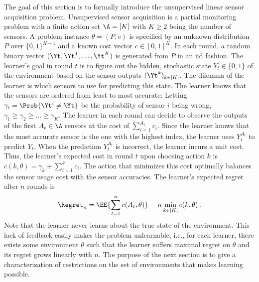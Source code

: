 The goal of this section is to formally introduce the unsupervised linear sensor acquisition problem.
Unsupervised sensor acquisition is a partial monitoring problem with a finite action set $\A = [K]$
with $K\ge 2$ being the number of sensors.
A problem instance $\theta = (P,c)$ is specified by an unknown distribution $P$ over 
$\{0,1\}^{K+1}$ and a known cost vector $c\in [0,1]^K$.
In each round, a random binary vector $(\Yt,\Yt^1,\dots,\Yt^K)$ is generated from $P$ in an iid fashion.
The learner's goal in round $t$ is to figure out 
the hidden, stochastic state $Y_t\in \{0,1\}$ of the environment based on the sensor outputs $(\Yt^{k})_{k\in [K]}$.
The dilemma of the learner is which sensors to use for predicting this state.
The learner knows that the sensors are ordered from least to most accurate:
Letting $\gamma_i  =\Prob{\Yt^{i}\ne \Yt}$ be the probability of sensor $i$ being wrong,
$\gamma_1\ge \gamma_2 \ge \dots \ge \gamma_K$.
The learner in each round can decide to observe the outputs of the first $A_t\in \A$ sensors
at the cost of $\sum_{i=1}^{A_t} c_i$.
Since the learner knows that the most accurate sensor is the one with the highest index,
the learner uses $Y_t^{A_t}$ to predict $Y_t$.
When the prediction $Y_t^{A_t}$ is incorrect, the learner incurs a unit cost. 
Thus, the learner's expected cost in round $t$ upon choosing action $k$ is
$c(k,\theta) = \gamma_k+\sum_{i=1}^k c_i$.
The action that minimizes this cost optimally balances the sensor usage cost with the sensor accuracies.
The learner's expected regret after $n$ rounds is 
\begin{align*}
\Regret_n = \EE{\sum_{t=1}^n c(A_t,\theta)} -\, n \min_{k\in [K]} c(k,\theta)\,.
\end{align*}
Note that the learner never learns about the true state of the environment. 
This lack of feedback easily makes the problem unlearnable, i.e., 
for each learner, there exists some environment $\theta$ such that the learner suffers
maximal regret on $\theta$ and its regret grows linearly with $n$.
The purpose of the next section is to give a characterization of restrictions on the set of environments
that makes learning possible.


